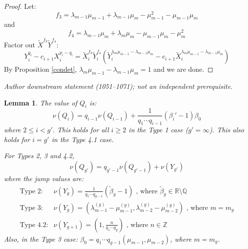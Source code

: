 \documentclass[10pt,a4paper]{amsart}
\newtheorem{lem}{Lemma}
\begin{document}
\begin{proof}
Let:
\begin{equation*}
f_3=\lambda_{m-1}\mu_{m-1}+\lambda_{m-1}\mu_m-\mu_{m-1}^2-\mu_{m-1}\mu_m
\end{equation*}
and
\begin{equation*}
f_4=\lambda_{m-1}\mu_m+\lambda_m\mu_m-\mu_{m-1}\mu_m-\mu_m^2
\end{equation*}
Factor out $\tilde X^{f_3}\tilde Y^{f_4}$:
\begin{equation*}
Y_{i}^{q_i} - c_{i+1}X_{i}^{p_i-q_i} = \tilde X_i^{f_3} \tilde Y_i^{f_4}\left(\tilde Y_i^{\lambda_m \mu_{m-1} - \lambda_{m-1} \mu_m} - c_{i+1}\tilde X_i^{\lambda_m\mu_{m-1}-\lambda_{m-1}\mu_m}\right)
\end{equation*}
By Proposition \ref{condet}, $\lambda_m\mu_{m-1}-\lambda_{m-1}\mu_m=1$ and we are done.
\end{proof}


\par\medskip\noindent\textit{Author downstream statement (1051--1071); not an independent prerequisite.}\par\smallskip
\begin{lem} \label{genvalue}
The value of $Q_i$ is:
\begin{equation} \label{usualgenvalue}
\nu(Q_i)=q_{i-1}\nu(Q_{i-1})+\frac{1}{q_1 \cdots q_{i-1}}(\beta_i'-1)\beta_0
\end{equation}
where $2\leq i < g'$. This holds for all $i\geq 2$ in the Type 1 case ($g'=\infty$). This also holds for $i=g'$ in the Type 4.1 case.

For Types 2, 3 and 4.2,
\begin{equation*}
\nu(Q_{g'})=q_{g'-1} \nu(Q_{g'-1})+\nu(Y_{g'})
\end{equation*}
where the jump values are:
\begin{equation*}
\begin{array}{ll}
\text{Type 2:} & \displaystyle \nu(Y_g)= \frac{1}{q_1\cdots q_{g-1}}\left(\tilde \beta_g -1\right) \text{ , where } \tilde \beta_{g}\in\mathbb{R}\setminus\mathbb{Q} \\
\text{Type 3:} & \displaystyle \nu(Y_g)= \left(\lambda_{m-1}^{(g)}-\mu_{m-1}^{(g)},\lambda_{m-2}^{(g)}-\mu_{m-2}^{(g)}\right) \text{ , where } m=m_g \\
\text{Type 4.2:} & \displaystyle \nu(Y_{g+1})=\left(1,\frac{n}{q_1 \cdots q_g}\right) \text{ , where } n\in\mathbb{Z}
\end{array}
\end{equation*}
Also, in the Type 3 case: $\beta_0=q_1\cdots q_{g-1}(\mu_{m-1},\mu_{m-2})$, where $m=m_g$.
\end{lem}
\end{document}
